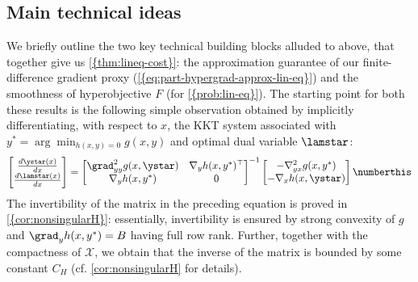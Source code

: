 \subsection{Main technical ideas}\label{sec:warmup-lin-eq}
We briefly outline the two key technical building blocks alluded to above, that together give us  \cref{{thm:lineq-cost}}: the approximation guarantee of our finite-difference gradient proxy (\cref{{eq:part-hypergrad-approx-lin-eq}}) and the smoothness of hyperobjective $F$ (for \cref{{prob:lin-eq}}). The starting point for both these results is the following simple observation obtained by implicitly differentiating, with respect to $x$, the KKT system associated with $y^*=\arg\min_{h(x,y)=0} g(x,y)$ and optimal dual variable $\lamstar$: 
 \[ \begin{bmatrix}\frac{d\ystar(x)}{dx}\\
\frac{d\lamstar(x)}{dx}
\end{bmatrix}= {\begin{bmatrix}\grad^2_{yy}g(x,\ystar) & \nabla_y h(x,y^{*})^{\top}\\
\nabla_y h(x,y^{*}) & 0
\end{bmatrix}^{-1}} \begin{bmatrix}-\nabla^2_{yx}g(x,y^{*})\\
-\nabla_x h(x,\ystar)\end{bmatrix} \numberthis\label{eq:def_matrix_H}\]
The invertibility of the matrix in the preceding equation is proved in  \cref{{cor:nonsingularH}}:
essentially,  invertibility is ensured by strong convexity of $g$ and $\grad_y h(x,y^*)=B$ having full row rank. Further, together with the compactness of $\mathcal{X}$, we obtain that the inverse of the matrix is bounded by some constant $C_H$ (cf. \cref{cor:nonsingularH} for details). 

